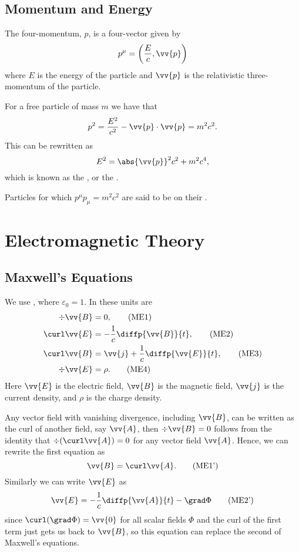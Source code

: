 \subsection{Momentum and Energy}
The four-momentum, \(p\), is a four-vector given by
\begin{equation}
    p^\mu = \left( \frac{E}{c}, \vv{p} \right)
\end{equation}
where \(E\) is the energy of the particle and \(\vv{p}\) is the relativistic three-momentum of the particle.

For a free particle of mass \(m\) we have that
\begin{equation}
    p^2 = \frac{E^2}{c^2} - \vv{p} \cdot \vv{p} = m^2c^2.
\end{equation}
This can be rewritten as
\begin{equation}
    E^2 = \abs{\vv{p}}^2c^2 + m^2c^4,
\end{equation}
which is known as the , or the .

Particles for which \(p^\mu p_\mu = m^2c^2\) are said to be on their .

\section{Electromagnetic Theory}
\subsection{Maxwell's Equations}
We use , where \(\varepsilon_0 = 1\).
In these units  are
\begin{align}
    \div \vv{B} &= 0, \tag{ME1}\\
    \curl \vv{E} &= -\frac{1}{c}\diffp{\vv{B}}{t}, \tag{ME2}\\
    \curl \vv{B} &= \vv{j} + \frac{1}{c} \diffp{\vv{E}}{t}, \tag{ME3}\\
    \div \vv{E} &= \rho. \tag{ME4}
\end{align}
Here \(\vv{E}\) is the electric field, \(\vv{B}\) is the magnetic field, \(\vv{j}\) is the current density, and \(\rho\) is the charge density.

Any vector field with vanishing divergence, including \(\vv{B}\), can be written as the curl of another field, say \(\vv{A}\), then \(\div\vv{B} = 0\) follows from the identity that \(\div(\curl \vv{A}) = 0\) for any vector field \(\vv{A}\).
Hence, we can rewrite the first equation as
\begin{equation}
    \vv{B} = \curl \vv{A}. \tag{ME1'}
\end{equation}
Similarly we can write \(\vv{E}\) as
\begin{equation}
    \vv{E} = -\frac{1}{c}\diffp{\vv{A}}{t} - \grad \Phi \tag{ME2'}
\end{equation}
since \(\curl(\grad\Phi) = \vv{0}\) for all scalar fields \(\Phi\) and the curl of the first term just gets us back to \(\vv{B}\), so this equation can replace the second of Maxwell's equations.

